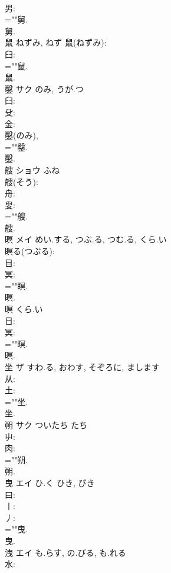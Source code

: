 \documentclass[8pt]{extreport}
\begin{document}
\begin{CJK}{UTF8}{min}
\\	男: 
\\	=""舅.
\\	舅.
\\	鼠		ねずみ, ねず			鼠(ねずみ): 
\\	臼: 
\\	=""鼠.
\\	鼠.
\\	鑿	サク	のみ, うが.つ		
\\	臼: 
\\	殳: 
\\	金: 
\\	鑿(のみ), 
\\	=""鑿.
\\	鑿.
\\	艘	ショウ	ふね		
\\	艘(そう): 
\\	舟: 
\\	叟: 
\\	=""艘.
\\	艘.
\\	瞑	メイ	めい.する, つぶ.る, つむ.る, くら.い		
\\	瞑る(つぶる): 
\\	目: 
\\	冥: 
\\	=""瞑.
\\	瞑.
\\	暝		くら.い				
\\	日: 
\\	冥: 
\\	=""暝.
\\	暝.
\\	坐	ザ	すわ.る, おわす, そぞろに, まします		
\\	从: 
\\	土: 
\\	=""坐.
\\	坐.
\\	朔	サク	ついたち	たち	
\\	屮: 
\\	肉: 
\\	=""朔.
\\	朔.
\\	曳	エイ	ひ.く	ひき, びき	
\\	曰: 
\\	丨: 
\\	丿: 
\\	=""曳.
\\	曳.
\\	洩	エイ	も.らす, の.びる, も.れる		
\\	水: 

\end{CJK}
\end{document}
